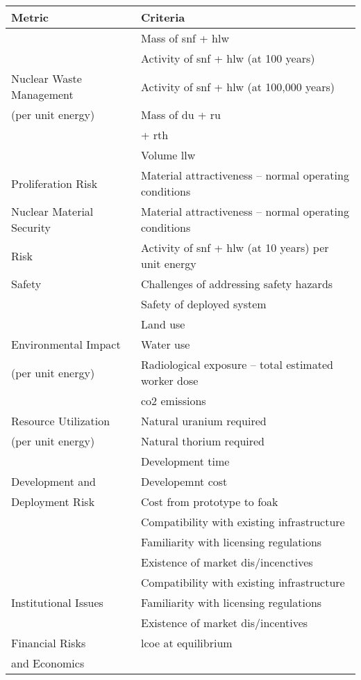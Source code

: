 \begin{tabular}{ll}
    \toprule
    Metric & Criteria \\
    \midrule
     & Mass of \ac{snf} + \ac{hlw}\\
     & Activity of \ac{snf} + \ac{hlw} (at 100 years)\\
    Nuclear Waste Management & Activity of \ac{snf} + \ac{hlw} (at 100,000 years)\\
    (per unit energy) & Mass of \ac{du} + \ac{ru}\\
     & \hspace{12em}+ \ac{rth}\\
     & Volume \ac{llw}\\
     \midrule
     Proliferation Risk & Material attractiveness -- normal operating conditions\\
     \midrule
     Nuclear Material Security & Material attractiveness -- normal operating conditions\\
    Risk & Activity of \ac{snf} + \ac{hlw} (at 10 years) per unit energy\\
    \midrule
    Safety & Challenges of addressing safety hazards\\
    & Safety of deployed system\\
    \midrule
    & Land use\\
    Environmental Impact  & Water use\\
    (per unit energy) & Radiological exposure -- total estimated worker dose\\
     & \Ac{co2} emissions\\
     \midrule
     Resource Utilization & Natural uranium required\\
    (per unit energy) & Natural thorium required\\
    \midrule
    & Development time\\
    Development and & Developemnt cost\\
    Deployment Risk & Cost from prototype to \ac{foak}\\
    & Compatibility with existing infrastructure\\
    &Familiarity with licensing regulations\\
    & Existence of market dis/incenctives\\
    \midrule
      & Compatibility with existing infrastructure\\
    Institutional Issues & Familiarity with licensing regulations\\
     & Existence of market dis/incentives\\
     \midrule
    Financial Risks & \ac{lcoe} at equilibrium\\
    and Economics &\\
    \bottomrule
\end{tabular}